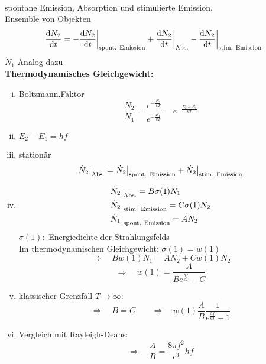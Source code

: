 \\
spontane Emission, Absorption und stimulierte Emission.\\[5pt]
Ensemble von Objekten
\begin{equation*}
\frac{\textrm{d} N_2}{\textrm{d} t} = - \frac{\textrm{d} N_2}{\textrm{d} t} \bigg|_{\textrm{spont. Emission}} + \frac{\textrm{d} N_2}{\textrm{d} t} \bigg|_{\textrm{Abs.}} - \frac{\textrm{d} N_2}{\textrm{d} t} \bigg|_{\textrm{stim. Emission}}
\end{equation*}
$ \dot{N}_1 $ Analog dazu\\[5pt]
\textbf{Thermodynamisches Gleichgewicht:}
\begin{enumerate}[i)]
	\item Boltzmann.Faktor
	\begin{equation*}
	\frac{N_2}{N_1} = \frac{e^{-\frac{E_2}{kT}}}{e^{-\frac{E_1}{kT}}} = e^{-\frac{E_2 - E_1}{kT}}
	\end{equation*}
	\item $ E_2 - E_1 = h f $
	\item stationär
	\begin{equation*}
	\dot{N}_2 \big|_{\textrm{Abs.}} = \dot{N}_2 \big|_{\textrm{spont. Emission}} + \dot{N}_2 \big|_{\textrm{stim. Emission}}
	\end{equation*}
	\item 
	
	
	\noindent
	\begin{align*}
	\dot{N}_2 & \big|_{\textrm{Abs.}} = B \sigma(1) N_1\\
	\dot{N}_2 & \big|_{\textrm{stim. Emission}} = C \sigma(1) N_2\\
	\dot{N}_1 & \big|_{\textrm{spont. Emission}} = A N_2
	\end{align*}
	$ \sigma(1) : $ Energiedichte der Strahlungsfelds\\[5pt]
	Im thermodynamischen Gleichgewicht: $ \sigma(1) = w(1) $
	\begin{equation*}
	\Rightarrow \quad B w(1) N_1 = A N_2 + C w(1) N_2
	\end{equation*}
	\begin{equation*}
	\Rightarrow \quad w(1) = \frac{A}{B e^{\frac{hf}{kT}} - C}
	\end{equation*}
	\item klassischer Grenzfall $ T \to \infty $:
	\begin{equation*}
	\Rightarrow \quad B = C \qquad \Rightarrow \quad w(1) \frac{A}{B} \frac{1}{e^{\frac{hf}{kT}} - 1}
	\end{equation*}
	\item Vergleich mit Rayleigh-Deans:
	\begin{equation*}
	\Rightarrow \quad \frac{A}{B} = \frac{8 \pi f^2}{c^3} h f
	\end{equation*}
\end{enumerate}
